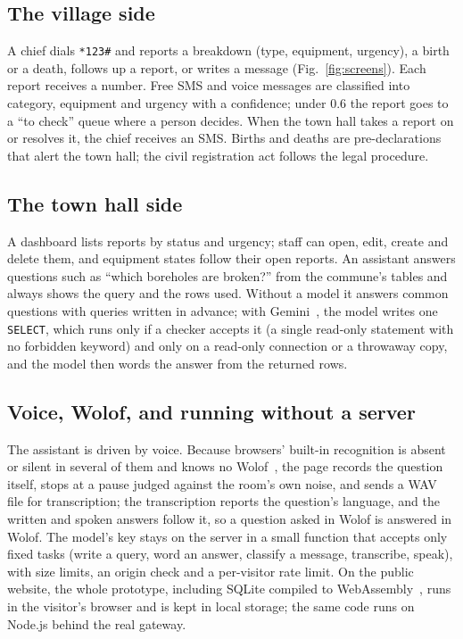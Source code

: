 \documentclass[conference]{IEEEtran}
\begin{document}
\subsection{The village side}
A chief dials \texttt{*123\#} and reports a breakdown (type, equipment,
urgency), a birth or a death, follows up a report, or writes a message
(Fig.~\ref{fig:screens}). Each report receives a number. Free SMS and voice
messages are classified into category, equipment and urgency with a
confidence; under 0.6 the report goes to a ``to check'' queue where a person
decides. When the town hall takes a report on or resolves it, the chief
receives an SMS. Births and deaths are pre-declarations that alert the town
hall; the civil registration act follows the legal procedure.

\subsection{The town hall side}
A dashboard lists reports by status and urgency; staff can open, edit,
create and delete them, and equipment states follow their open reports. An
assistant answers questions such as ``which boreholes are broken?'' from the
commune's tables and always shows the query and the rows used. Without a
model it answers common questions with queries written in advance; with
Gemini~\cite{gemini}, the model writes one \texttt{SELECT}, which runs only if
a checker accepts it (a single read-only statement with no forbidden keyword)
and only on a read-only connection or a throwaway copy, and the model then
words the answer from the returned rows.

\subsection{Voice, Wolof, and running without a server}
The assistant is driven by voice. Because browsers' built-in recognition is
absent or silent in several of them and knows no Wolof~\cite{webspeech}, the
page records the question itself, stops at a pause judged against the room's
own noise, and sends a WAV file for transcription; the transcription reports
the question's language, and the written and spoken answers follow it, so a
question asked in Wolof is answered in Wolof. The model's key stays on the
server in a small function that accepts only fixed tasks (write a query, word
an answer, classify a message, transcribe, speak), with size limits, an
origin check and a per-visitor rate limit. On the public website, the whole
prototype, including SQLite compiled to WebAssembly~\cite{sqljs}, runs in the
visitor's browser and is kept in local storage; the same code runs on Node.js
behind the real gateway.
\end{document}
